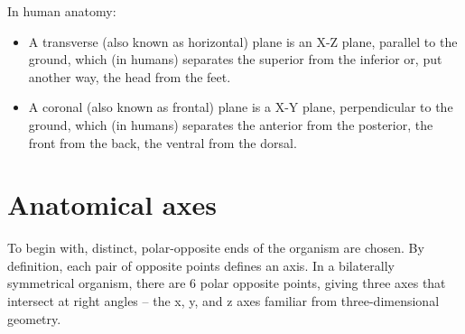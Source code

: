 In human anatomy:

\begin{itemize}
\tightlist
\item
  A transverse (also known as horizontal) plane is an X-Z plane, parallel to the ground, which (in humans) separates the superior from the inferior or, put another way, the head from the feet.
\item
  A coronal (also known as frontal) plane is a X-Y plane, perpendicular to the ground, which (in humans) separates the anterior from the posterior, the front from the back, the ventral from the dorsal.
\end{itemize}

\hypertarget{anatomical-axes}{%
\section{Anatomical axes}\label{anatomical-axes}}

To begin with, distinct, polar-opposite ends of the organism are chosen. By definition, each pair of opposite points defines an axis. In a bilaterally symmetrical organism, there are 6 polar opposite points, giving three axes that intersect at right angles -- the x, y, and z axes familiar from three-dimensional geometry.

